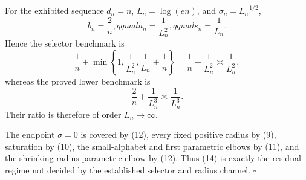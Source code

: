 For the exhibited sequence \(d_n=n\), \(L_n=\log(en)\), and \(\sigma_n=L_n^{-1/2}\),
\[
b_n=\frac2n,qquad u_n=\frac1{L_n^2},qquad s_n=\frac1{L_n}.
\tag{16}
\]
Hence the selector benchmark is
\[
\frac1n+\min\left\{1,\frac1{L_n^2},\frac1{L_n}+\frac1n\right\}
=\frac1n+\frac1{L_n^2}
\asymp\frac1{L_n^2},
\tag{17}
\]
whereas the proved lower benchmark is
\[
\frac2n+\frac1{L_n^3}
\asymp\frac1{L_n^3}.
\tag{18}
\]
Their ratio is therefore of order \(L_n\to\infty\).

The endpoint \(\sigma=0\) is covered by (12), every fixed positive radius by (9), saturation by (10), the small-alphabet and first parametric elbows by (11), and the shrinking-radius parametric elbow by (12).  Thus (14) is exactly the residual regime not decided by the established selector and radius channel. \(\square\)